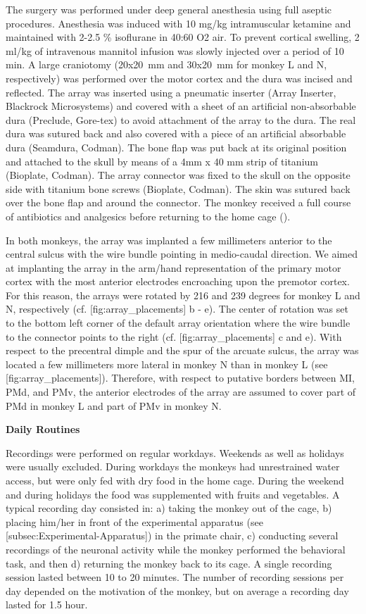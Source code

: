 {The surgery was performed under deep general anesthesia using full aseptic procedures. Anesthesia was induced with 10 mg/kg intramuscular ketamine and maintained with 2-2.5 \% isoflurane in 40:60 O2 air. To prevent cortical swelling, 2 ml/kg of intravenous mannitol infusion was slowly injected over a period of 10 min. A large craniotomy (20x20 mm and 30x20 mm for monkey L and N, respectively) was performed over the motor cortex and the dura was incised and reflected. The array was inserted using a pneumatic inserter (Array Inserter, Blackrock Microsystems) and covered with a sheet of an artificial non-absorbable dura (Preclude, Gore-tex) to avoid attachment of the array to the dura. The real dura was sutured back and also covered with a piece of an artificial absorbable dura (Seamdura, Codman). The bone flap was put back at its original position and attached to the skull by means of a 4mm x 40 mm strip of titanium (Bioplate, Codman). The array connector was fixed to the skull on the opposite side with titanium bone screws (Bioplate, Codman). The skin was sutured back over the bone flap and around the connector. The monkey received a full course of antibiotics and analgesics before returning to the home cage (\cite{Riehle_2013}).

In both monkeys, the array was implanted a few millimeters anterior to the central sulcus with the wire bundle pointing in medio-caudal direction. We aimed at implanting the array in the arm/hand representation of the primary motor cortex with the most anterior electrodes encroaching upon the premotor cortex. For this reason, the arrays were rotated by 216 and 239 degrees for monkey L and N, respectively (cf. [fig:array\_placements] b - e). The center of rotation was set to the bottom left corner of the default array orientation where the wire bundle to the connector points to the right (cf. [fig:array\_placements] c and e). With respect to the precentral dimple and the spur of the arcuate sulcus, the array was located a few millimeters more lateral in monkey N than in monkey L (see [fig:array\_placements]). Therefore, with respect to putative borders between MI, PMd, and PMv, the anterior electrodes of the array are assumed to cover part of PMd in monkey L and part of PMv in monkey N. 

\textbf{Daily Routines}

Recordings were performed on regular workdays. Weekends as well as holidays were usually excluded. During workdays the monkeys had unrestrained water access, but were only fed with dry food in the home cage. During the weekend and during holidays the food was supplemented with fruits and vegetables. A typical recording day consisted in: a) taking the monkey out of the cage, b) placing him/her in front of the experimental apparatus (see [subsec:Experimental-Apparatus]) in the primate chair, c) conducting several recordings of the neuronal activity while the monkey performed the behavioral task, and then d) returning the monkey back to its cage. A single recording session lasted between 10 to 20 minutes. The number of recording sessions per day depended on the motivation of the monkey, but on average a recording day lasted for 1.5 hour.

}
